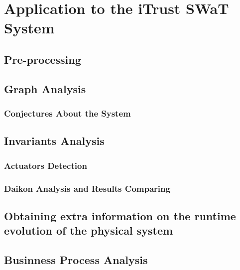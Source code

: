 \chapter{Application to the iTrust SWaT System}
\label{application}

\section{Pre-processing}
\label{sec:app_preprocessing}

\section{Graph Analysis}
\label{sec:app_graphs}

\subsection{Conjectures About the System}

\section{Invariants Analysis}
\label{sec:app_invariants}

\subsection{Actuators Detection}
\subsection{Daikon Analysis and Results Comparing}

\section{Obtaining extra information on the runtime evolution of the physical system}
\label{sec:app_extrainfo}

\section{Businness Process Analysis}
\label{sec:app_bpa}